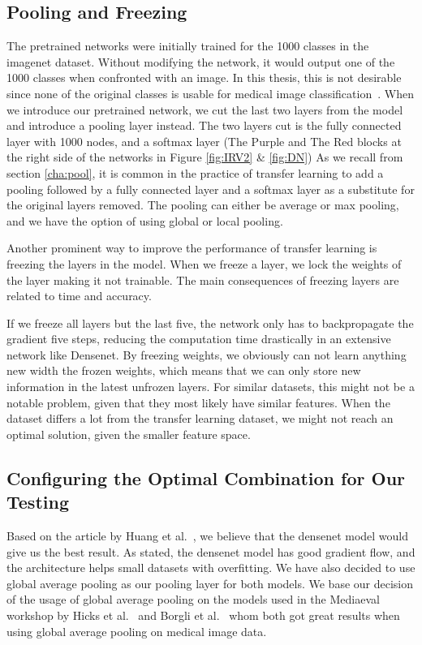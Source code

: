 \subsection{Pooling and Freezing}
The pretrained networks were initially trained for the 1000 classes in the imagenet dataset. Without modifying the network, it would output one of the 1000 classes when confronted with an image. In this thesis, this is not desirable since none of the original classes is usable for medical image classification~\cite{imagenet_cvpr09,imagenet}.
When we introduce our pretrained network, we cut the last two layers from the model and introduce a pooling layer instead.
The two layers cut is the fully connected layer with 1000 nodes, and a softmax layer (The Purple and The Red blocks at the right side of the networks in Figure \ref{fig:IRV2} \& \ref{fig:DN})
As we recall from section \ref{cha:pool}, it is common in the practice of transfer learning to add a pooling followed by a fully connected layer and a softmax layer as a substitute for the original layers removed.  The pooling can either be average or max pooling, and we have the option of using global or local pooling. 

Another prominent way to improve the performance of transfer learning is freezing the layers in the model. When we freeze a layer, we lock the weights of the layer making it not trainable.
The main consequences of freezing layers are related to time and accuracy. 

If we freeze all layers but the last five, the network only has to backpropagate the gradient five steps, reducing the computation time drastically in an extensive network like Densenet. 
By freezing weights, we obviously can not learn anything new width the frozen weights, which means that we can only store new information in the latest unfrozen layers. For similar datasets, this might not be a notable problem, given that they most likely have similar features. When the dataset differs a lot from the transfer learning dataset, we might not reach an optimal solution, given the smaller feature space.





\subsection{Configuring the Optimal Combination for Our Testing}
Based on the article by Huang et al.~\cite{Huang_2017}, we believe that the densenet model would give us the best result. As stated, the densenet model has good gradient flow, and the architecture helps small datasets with overfitting. 
We have also decided to use global average pooling as our pooling layer for both models. We base our decision of the usage of global average pooling on the models used in the Mediaeval workshop by Hicks et al.~\cite{26207} and Borgli et al.~\cite{runeMedico2018} whom both got great results when using global average pooling on medical image data.


